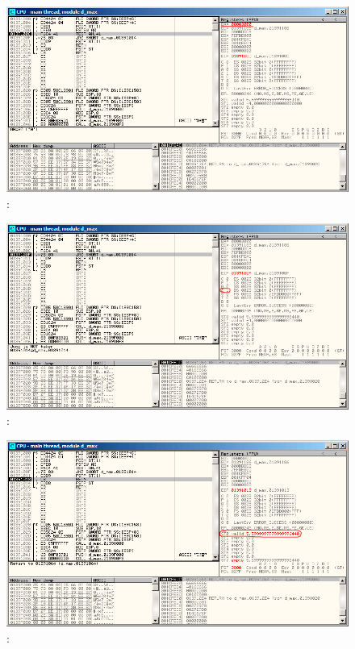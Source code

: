 \begin{figure}[H]
\centering
\includegraphics[scale=\FigScale]{patterns/12_FPU/3_comparison/x86/MSVC_Ox/olly2_3.png}
\caption{\olly: \FNSTSW {}}
\label{fig:FPU_comparison_Ox_case2_olly3}
\end{figure}

\begin{figure}[H]
\centering
\includegraphics[scale=\FigScale]{patterns/12_FPU/3_comparison/x86/MSVC_Ox/olly2_4.png}
\caption{\olly: \TEST {}}
\label{fig:FPU_comparison_Ox_case2_olly4}
\end{figure}

\begin{figure}[H]
\centering
\includegraphics[scale=\FigScale]{patterns/12_FPU/3_comparison/x86/MSVC_Ox/olly2_5.png}
\caption{\olly: \FSTP {}}
\label{fig:FPU_comparison_Ox_case2_olly5}
\end{figure}
